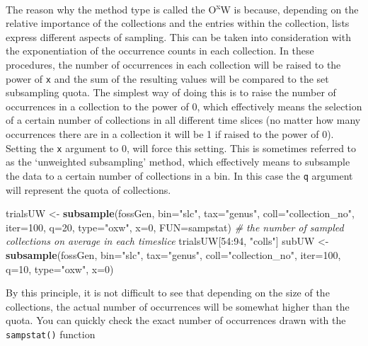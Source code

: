 \documentclass[]{article}
\newenvironment{Shaded}{\begin{snugshade}}{\end{snugshade}}
\newcommand{\KeywordTok}[1]{\textcolor[rgb]{0.13,0.29,0.53}{\textbf{{#1}}}}
\newcommand{\DataTypeTok}[1]{\textcolor[rgb]{0.13,0.29,0.53}{{#1}}}
\newcommand{\DecValTok}[1]{\textcolor[rgb]{0.00,0.00,0.81}{{#1}}}
\newcommand{\StringTok}[1]{\textcolor[rgb]{0.31,0.60,0.02}{{#1}}}
\newcommand{\CommentTok}[1]{\textcolor[rgb]{0.56,0.35,0.01}{\textit{{#1}}}}
\newcommand{\NormalTok}[1]{{#1}}
\begin{document}
The reason why the method type is called the O\textsuperscript{x}W is
because, depending on the relative importance of the collections and the
entries within the collection, lists express different aspects of
sampling. This can be taken into consideration with the exponentiation
of the occurrence counts in each collection. In these procedures, the
number of occurrences in each collection will be raised to the power of
\texttt{x} and the sum of the resulting values will be compared to the
set subsampling quota. The simplest way of doing this is to raise the
number of occurrences in a collection to the power of 0, which
effectively means the selection of a certain number of collections in
all different time slices (no matter how many occurrences there are in a
collection it will be 1 if raised to the power of 0). Setting the
\texttt{x} argument to 0, will force this setting. This is sometimes
referred to as the `unweighted subsampling' method, which effectively
means to subsample the data to a certain number of collections in a bin.
In this case the \texttt{q} argument will represent the quota of
collections.

\begin{Shaded}
\begin{Highlighting}[]
\NormalTok{trialsUW <-}\StringTok{ }\KeywordTok{subsample}\NormalTok{(fossGen, }\DataTypeTok{bin=}\StringTok{"slc"}\NormalTok{, }\DataTypeTok{tax=}\StringTok{"genus"}\NormalTok{, }\DataTypeTok{coll=}\StringTok{"collection_no"}\NormalTok{,}
  \DataTypeTok{iter=}\DecValTok{100}\NormalTok{, }\DataTypeTok{q=}\DecValTok{20}\NormalTok{, }\DataTypeTok{type=}\StringTok{"oxw"}\NormalTok{, }\DataTypeTok{x=}\DecValTok{0}\NormalTok{, }\DataTypeTok{FUN=}\NormalTok{sampstat)}
\CommentTok{# the number of sampled collections on average in each timeslice}
\NormalTok{trialsUW[}\DecValTok{54}\NormalTok{:}\DecValTok{94}\NormalTok{, }\StringTok{"colls"}\NormalTok{]}
\NormalTok{subUW <-}\StringTok{ }\KeywordTok{subsample}\NormalTok{(fossGen, }\DataTypeTok{bin=}\StringTok{"slc"}\NormalTok{, }\DataTypeTok{tax=}\StringTok{"genus"}\NormalTok{, }\DataTypeTok{coll=}\StringTok{"collection_no"}\NormalTok{,}
  \DataTypeTok{iter=}\DecValTok{100}\NormalTok{, }\DataTypeTok{q=}\DecValTok{10}\NormalTok{, }\DataTypeTok{type=}\StringTok{"oxw"}\NormalTok{, }\DataTypeTok{x=}\DecValTok{0}\NormalTok{)}
\end{Highlighting}
\end{Shaded}

By this principle, it is not difficult to see that depending on the size
of the collections, the actual number of occurrences will be somewhat
higher than the quota. You can quickly check the exact number of
occurrences drawn with the \texttt{sampstat()} function
\end{document}
